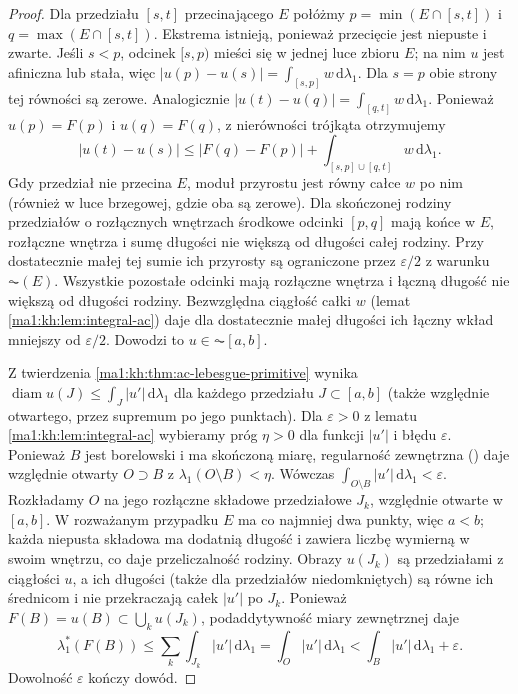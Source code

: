 \begin{proof}
Dla przedziału $[s,t]$ przecinającego $E$ połóżmy
$p=\min(E\cap[s,t])$ i $q=\max(E\cap[s,t])$.
Ekstrema istnieją, ponieważ przecięcie jest niepuste
i zwarte. Jeśli $s<p$, odcinek $[s,p)$ mieści się
w jednej luce zbioru $E$; na nim $u$ jest afiniczna
lub stała, więc $|u(p)-u(s)|=\int_{[s,p]}w\,\mathrm d\lambda_1$.
Dla $s=p$ obie strony tej równości są zerowe.
Analogicznie $|u(t)-u(q)|=\int_{[q,t]}w\,\mathrm d\lambda_1$.
Ponieważ $u(p)=F(p)$ i $u(q)=F(q)$, z nierówności
trójkąta otrzymujemy
\[
 |u(t)-u(s)|\le |F(q)-F(p)|+
 \int_{[s,p]\cup[q,t]}w\,\mathrm d\lambda_1.
\]
Gdy przedział nie przecina $E$, moduł przyrostu jest równy całce $w$ po nim (również w luce brzegowej, gdzie oba są zerowe).
Dla skończonej rodziny przedziałów o rozłącznych wnętrzach środkowe odcinki $[p,q]$ mają końce w $E$, rozłączne wnętrza i sumę długości nie większą od długości całej rodziny. Przy dostatecznie małej tej sumie ich przyrosty są ograniczone przez $\varepsilon/2$ z warunku $\AC(E)$. Wszystkie pozostałe odcinki mają rozłączne wnętrza i łączną długość nie większą od długości rodziny. Bezwzględna ciągłość całki $w$ (lemat \ref{ma1:kh:lem:integral-ac}) daje dla dostatecznie małej długości ich łączny wkład mniejszy od $\varepsilon/2$. Dowodzi to $u\in\AC[a,b]$.

Z twierdzenia \ref{ma1:kh:thm:ac-lebesgue-primitive} wynika $\operatorname{diam}u(J)\le\int_J|u'|\,\mathrm d\lambda_1$ dla każdego przedziału $J\subset[a,b]$ (także względnie otwartego, przez supremum po jego punktach).
Dla $\varepsilon>0$ z lematu \ref{ma1:kh:lem:integral-ac} wybieramy próg $\eta>0$ dla funkcji $|u'|$ i błędu $\varepsilon$. Ponieważ $B$ jest borelowski i ma skończoną miarę, regularność zewnętrzna () daje względnie otwarty $O\supset B$ z $\lambda_1(O\setminus B)<\eta$. Wówczas $\int_{O\setminus B}|u'|\,\mathrm d\lambda_1<\varepsilon$. Rozkładamy $O$ na jego rozłączne składowe przedziałowe $J_k$, względnie otwarte w $[a,b]$. W rozważanym przypadku $E$ ma co najmniej dwa punkty, więc $a<b$; każda niepusta składowa ma dodatnią długość i zawiera liczbę wymierną w swoim wnętrzu, co daje przeliczalność rodziny. Obrazy $u(J_k)$ są przedziałami z ciągłości $u$, a ich długości (także dla przedziałów niedomkniętych) są równe ich średnicom i nie przekraczają całek $|u'|$ po $J_k$. Ponieważ $F(B)=u(B)\subset\bigcup_k u(J_k)$, podaddytywność miary zewnętrznej daje
\[
 \lambda_1^*(F(B))\le\sum_k\int_{J_k}|u'|\,\mathrm d\lambda_1
 =\int_O|u'|\,\mathrm d\lambda_1
 <\int_B|u'|\,\mathrm d\lambda_1+\varepsilon.
\]
Dowolność $\varepsilon$ kończy dowód.
\end{proof}
